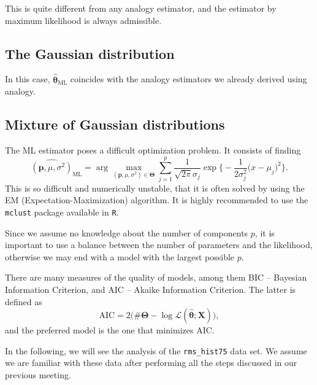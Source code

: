 This is quite different from any analogy estimator, and the estimator by maximum likelihood is always admissible.

\subsection{The Gaussian distribution}

In this case, $\widehat{\bm\theta}_{\text{ML}}$ coincides with the analogy estimators we already derived using analogy.

\subsection{Mixture of Gaussian distributions}

The ML estimator poses a difficult optimization problem.
It consists of finding
\begin{equation}
\widehat{(\bm p,\mu,\sigma^2)}_{\text{ML}} = \arg\max_{(\bm p,\mu,\sigma^2)\in\bm{\Theta}}
\sum_{j=1}^{p}
\frac{1}{\sqrt{2\pi}\sigma_j} \exp\Big\{
-\frac{1}{2\sigma_j^2} \big(x - \mu_j)^2 \Big\}.
\end{equation}
This is so difficult and numerically unstable, that it is often solved by using the EM (Expectation-Maximization) algorithm.
It is highly recommended to use the \texttt{mclust} package\cite{mclust4} available in \texttt{R}\cite{Rmanual}.

Since we assume no knowledge about the number of components $p$, it is important to use a balance between the number of parameters and the likelihood, otherwise we may end with a model with the largest possible $p$.

There are many measures of the quality of models, among them BIC -- Bayesian Information Criterion, and AIC -- Akaike Information Criterion.
The latter is defined as
$$
\text{AIC} = 2\big(\#\bm\Theta - \log \mathcal L(\widehat{\bm{\theta}};\bm X)\big),
$$
and the preferred model is the one that minimizes AIC.

In the following, we will see the analysis of the \verb|rms_hist75| data set.
We assume we are familiar with these data after performing all the steps discussed in our previous meeting.

